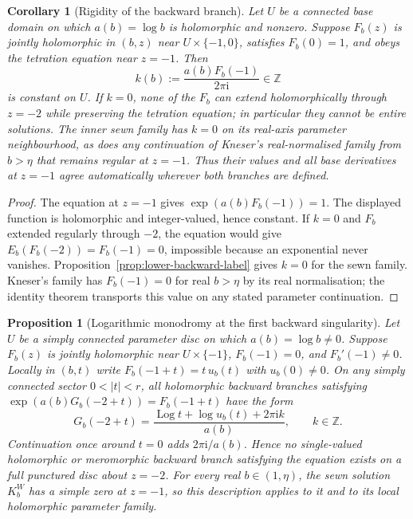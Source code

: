 \documentclass[11pt,a4paper]{article}
\newtheorem{proposition}[theorem]{Proposition}
\newtheorem{corollary}[theorem]{Corollary}
\theoremstyle{definition}
\newcommand{\Kk}{K}
\newcommand{\ii}{\mathrm{i}}
\begin{document}
\begin{corollary}[Rigidity of the backward branch]
\label{cor:backward-rigidity}
Let $U$ be a connected base domain on which $a(b)=\log b$ is holomorphic
and nonzero.  Suppose $F_b(z)$ is jointly holomorphic in $(b,z)$ near
$U\times\{-1,0\}$, satisfies $F_b(0)=1$, and obeys the tetration equation
near $z=-1$.  Then
\[
 k(b):=\frac{a(b)F_b(-1)}{2\pi\ii}\in\mathbb Z
\]
is constant on $U$.  If $k=0$, none of the $F_b$ can extend
holomorphically through $z=-2$ while preserving the tetration equation;
in particular they cannot be entire solutions.  The inner sewn family
has $k=0$ on its real-axis parameter neighbourhood, as does any
continuation of Kneser's real-normalised family from $b>\eta$ that
remains regular at $z=-1$.  Thus their values and all base derivatives
at $z=-1$ agree automatically wherever both branches are defined.
\end{corollary}

\begin{proof}
The equation at $z=-1$ gives $\exp(a(b)F_b(-1))=1$.
The displayed function is holomorphic and integer-valued, hence
constant.  If $k=0$ and $F_b$ extended regularly through $-2$, the
equation would give $E_b(F_b(-2))=F_b(-1)=0$, impossible because an
exponential never vanishes.  Proposition~\ref{prop:lower-backward-label}
gives $k=0$ for the sewn family.  Kneser's family has $F_b(-1)=0$ for
real $b>\eta$ by its real normalisation; the identity theorem transports
this value on any stated parameter continuation.
\end{proof}

\begin{proposition}[Logarithmic monodromy at the first backward singularity]
\label{prop:backward-log-monodromy}
Let $U$ be a simply connected parameter disc on which $a(b)=\log b\ne0$.
Suppose $F_b(z)$ is jointly holomorphic near $U\times\{-1\}$,
$F_b(-1)=0$, and $F_b'(-1)\ne0$.  Locally in $(b,t)$ write
$F_b(-1+t)=t\,u_b(t)$ with $u_b(0)\ne0$.  On any simply connected
sector $0<|t|<r$, all holomorphic backward branches satisfying
$\exp(a(b)G_b(-2+t))=F_b(-1+t)$ have the form
\[
 G_b(-2+t)=\frac{\operatorname{Log}t+\log u_b(t)+2\pi\ii k}{a(b)},
 \qquad k\in\mathbb Z.
\]
Continuation once around $t=0$ adds $2\pi\ii/a(b)$.  Hence no
single-valued holomorphic or meromorphic backward branch satisfying
the equation exists on a full punctured disc about $z=-2$.
For every real $b\in(1,\eta)$, the sewn solution $\Kk_b^W$ has a
simple zero at $z=-1$, so this description applies to it and to its
local holomorphic parameter family.
\end{proposition}
\end{document}
